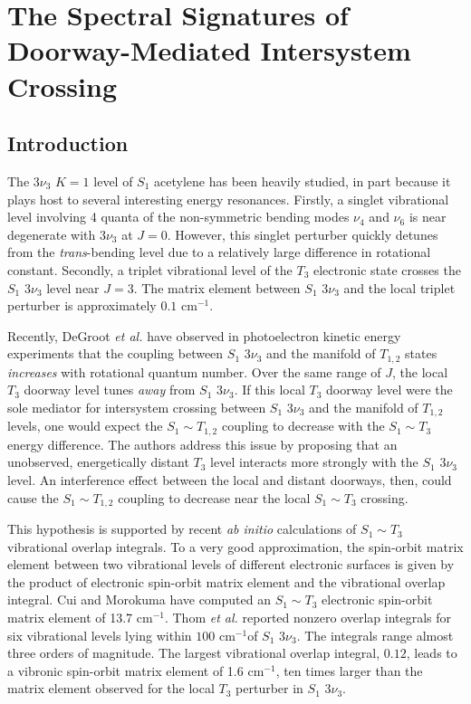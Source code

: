 \documentclass[12pt]{mitthesis}
\newcommand{\rcm}{cm$^{-1}$}
\newcommand{\tnt}{$S_1$ $3\nu_3$}
\begin{document}
\chapter{The Spectral Signatures of Doorway-Mediated Intersystem
  Crossing}

\section{Introduction}

The $3\nu_3$ $K=1$ level of $S_1$ acetylene has been heavily studied,
in part because it plays host to several interesting energy
resonances.  Firstly, a singlet vibrational level involving 4 quanta
of the non-symmetric bending modes $\nu_4$ and $\nu_6$ is near
degenerate with $3\nu_3$ at $J=0$.  However, this singlet perturber
quickly detunes from the \emph{trans}-bending level due to a
relatively large difference in rotational constant.  Secondly, a
triplet vibrational level of the $T_3$ electronic state crosses the
$S_1$ $3\nu_3$ level near $J=3$.  The matrix element between $S_1$
$3\nu_3$ and the local triplet perturber is approximately $0.1$ \rcm.

Recently, DeGroot \emph{et al.} have observed in photoelectron kinetic
energy experiments that the coupling between $S_1$ $3\nu_3$ and the
manifold of $T_{1,2}$ states \emph{increases} with rotational quantum
number.  Over the same range of $J$, the local $T_3$ doorway level
tunes \emph{away} from $S_1$ $3\nu_3$.  If this local $T_3$ doorway
level were the sole mediator for intersystem crossing between $S_1$
$3\nu_3$ and the manifold of $T_{1,2}$ levels, one would expect the
$S_1 \sim T_{1,2}$ coupling to decrease with the $S_1 \sim T_3$ energy
difference.  The authors address this issue by proposing that an
unobserved, energetically distant $T_3$ level interacts more strongly
with the $S_1$ $3\nu_3$ level.  An interference effect between the
local and distant doorways, then, could cause the $S_1 \sim T_{1,2}$
coupling to decrease near the local $S_1 \sim T_3$ crossing.

This hypothesis is supported by recent \emph{ab initio} calculations
of $S_1 \sim T_3$ vibrational overlap integrals.  To a very good
approximation, the spin-orbit matrix element between two vibrational
levels of different electronic surfaces is given by the product of
electronic spin-orbit matrix element and the vibrational overlap
integral.  Cui and Morokuma have computed an $S_1 \sim T_3$ electronic
spin-orbit matrix element of 13.7 \rcm.  Thom \emph{et al.}  reported
nonzero overlap integrals for six vibrational levels lying within
$100$ \rcm of \tnt.  The integrals range almost three orders of
magnitude.  The largest vibrational overlap integral, $0.12$, leads to
a vibronic spin-orbit matrix element of 1.6 \rcm, ten times larger
than the matrix element observed for the local $T_3$ perturber in
\tnt.
\end{document}
